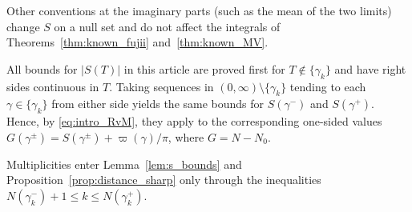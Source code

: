 \documentclass[11pt,a4paper]{article}
\makeatletter
\numberwithin{equation}{section}
\DeclareRobustCommand{\CGref}[1]{\ref{#1}}
\DeclareRobustCommand{\CGeqref}[1]{\eqref{#1}}
\let\CG@origref\ref
\let\CG@origeqref\eqref
\newcommand{\CG@gettip}[1]{\@ifundefined{CGTip@#1}{#1}{\csname CGTip@#1\endcsname}}
\DeclareRobustCommand{\CGref}[1]{\pdftooltip{\CG@origref{#1}}{\CG@gettip{#1}}}
\DeclareRobustCommand{\CGeqref}[1]{\pdftooltip{\CG@origeqref{#1}}{\CG@gettip{#1}}}
\theoremstyle{definition}
\theoremstyle{remark}
\newcommand{\Nz}{N_0} %
\makeatother
\begin{document}
Other conventions at the imaginary parts (such as the mean of the two limits) change $S$ on a null set and do not affect the integrals of Theorems~\CGref{thm:known_fujii} and~\CGref{thm:known_MV}.

All bounds for $|S(T)|$ in this article are proved first for $T\notin\{\gamma_k\}$ and have right sides continuous in $T$. Taking sequences in $(0,\infty)\setminus\{\gamma_k\}$ tending to each $\gamma\in\{\gamma_k\}$ from either side yields the same bounds for $S(\gamma^-)$ and $S(\gamma^+)$. Hence, by \CGeqref{eq:intro_RvM}, they apply to the corresponding one-sided values $G(\gamma^\pm)=S(\gamma^\pm)+\varpi(\gamma)/\pi$, where $G=N-\Nz$.

Multiplicities enter Lemma~\CGref{lem:s_bounds} and Proposition~\CGref{prop:distance_sharp} only through the inequalities $N(\gamma_k^-)+1\le k\le N(\gamma_k^+)$.
\end{document}
